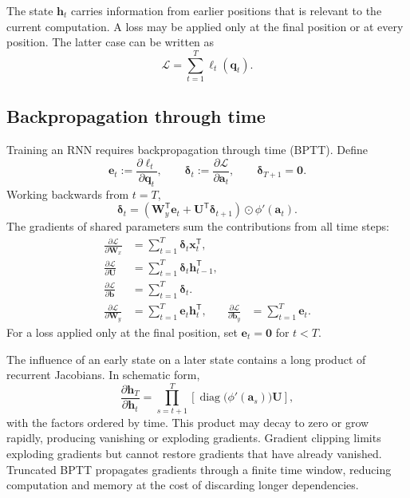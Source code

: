The state \(\mathbf{h}_t\) carries information from earlier positions that is relevant to the current computation. A loss may be applied only at the final position or at every position. The latter case can be written as
\[
    \mathcal{L}=\sum_{t=1}^{T}\ell_t(\mathbf{q}_t).
\]

\subsection{Backpropagation through time}

Training an RNN requires backpropagation through time (BPTT). Define
\[
    \mathbf e_t
    :=\frac{\partial\ell_t}{\partial\mathbf q_t},
    \qquad
    \boldsymbol{\delta}_t
    :=\frac{\partial\mathcal{L}}{\partial\mathbf{a}_t},
    \qquad
    \boldsymbol{\delta}_{T+1}=\mathbf{0}.
\]
Working backwards from \(t=T\),
\begin{equation}
    \boldsymbol{\delta}_t
    =\left(
      \mathbf W_y^{\mathsf T}\mathbf e_t
      +\mathbf{U}^{\mathsf T}\boldsymbol{\delta}_{t+1}
    \right)
    \odot\phi'(\mathbf{a}_t).
    \label{eq:bptt-recurrence}
\end{equation}
The gradients of shared parameters sum the contributions from all time steps:
\begin{align}
    \frac{\partial\mathcal{L}}{\partial\mathbf{W}_x}
    &=\sum_{t=1}^{T}
      \boldsymbol{\delta}_t\mathbf{x}_t^{\mathsf T},
    \label{eq:bptt-wx}\\
    \frac{\partial\mathcal{L}}{\partial\mathbf{U}}
    &=\sum_{t=1}^{T}
      \boldsymbol{\delta}_t\mathbf{h}_{t-1}^{\mathsf T},
    \label{eq:bptt-u}\\
    \frac{\partial\mathcal{L}}{\partial\mathbf{b}}
    &=\sum_{t=1}^{T}\boldsymbol{\delta}_t.
    \label{eq:bptt-b}
    \\
    \frac{\partial\mathcal{L}}{\partial\mathbf{W}_y}
    &=\sum_{t=1}^{T}\mathbf e_t\mathbf h_t^{\mathsf T},
    &
    \frac{\partial\mathcal{L}}{\partial\mathbf b_y}
    &=\sum_{t=1}^{T}\mathbf e_t.
    \label{eq:bptt-output}
\end{align}
For a loss applied only at the final position, set $\mathbf e_t=\mathbf 0$ for $t<T$.

The influence of an early state on a later state contains a long product of recurrent Jacobians. In schematic form,
\[
    \frac{\partial\mathbf{h}_T}{\partial\mathbf{h}_t}
    =\prod_{s=t+1}^{T}
      \left[
      \operatorname{diag}\!\bigl(\phi'(\mathbf{a}_s)\bigr)
      \mathbf{U}
      \right],
\]
with the factors ordered by time. This product may decay to zero or grow rapidly, producing vanishing or exploding gradients. Gradient clipping limits exploding gradients but cannot restore gradients that have already vanished. Truncated BPTT propagates gradients through a finite time window, reducing computation and memory at the cost of discarding longer dependencies.

